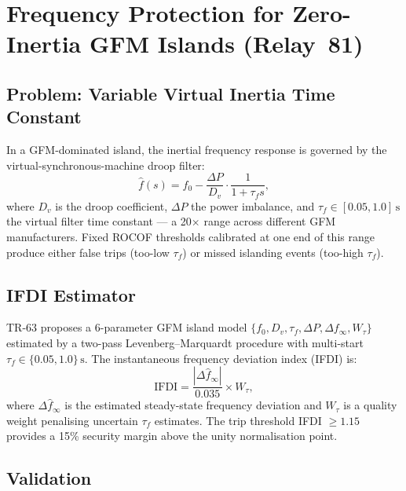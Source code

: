 \section{Frequency Protection for Zero-Inertia GFM Islands (Relay~81)}
\label{sec:ch6_relay81}

\subsection{Problem: Variable Virtual Inertia Time Constant}
\label{sec:ch6_relay81_problem}

In a GFM-dominated island, the inertial frequency response is governed by the
virtual-synchronous-machine droop filter:
\begin{equation}
  \hat{f}(s) = f_0 - \frac{\Delta P}{D_v} \cdot \frac{1}{1 + \tau_f s},
  \label{eq:ch6_gfm_freq}
\end{equation}
where $D_v$ is the droop coefficient, $\Delta P$ the power imbalance, and
$\tau_f \in [0.05, 1.0]\,\text{s}$ the virtual filter time constant — a
20$\times$ range across different GFM manufacturers.
Fixed ROCOF thresholds calibrated at one end of this range produce either
false trips (too-low $\tau_f$) or missed islanding events (too-high $\tau_f$).

\subsection{IFDI Estimator}
\label{sec:ch6_relay81_ifdi}

TR-63 proposes a 6-parameter GFM island model
$\{f_0, D_v, \tau_f, \Delta P, \Delta f_\infty, W_\tau\}$ estimated by a
two-pass Levenberg--Marquardt procedure with multi-start
$\tau_f \in \{0.05, 1.0\}\,\text{s}$.
The instantaneous frequency deviation index (IFDI) is:
\begin{equation}
  \mathrm{IFDI} = \frac{|\Delta\hat{f}_\infty|}{0.035} \times W_\tau,
  \label{eq:ch6_ifdi}
\end{equation}
where $\Delta\hat{f}_\infty$ is the estimated steady-state frequency deviation
and $W_\tau$ is a quality weight penalising uncertain $\tau_f$ estimates.
The trip threshold IFDI $\geq 1.15$ provides a 15\% security margin above the
unity normalisation point.

\subsection{Validation}
\label{sec:ch6_relay81_val}


